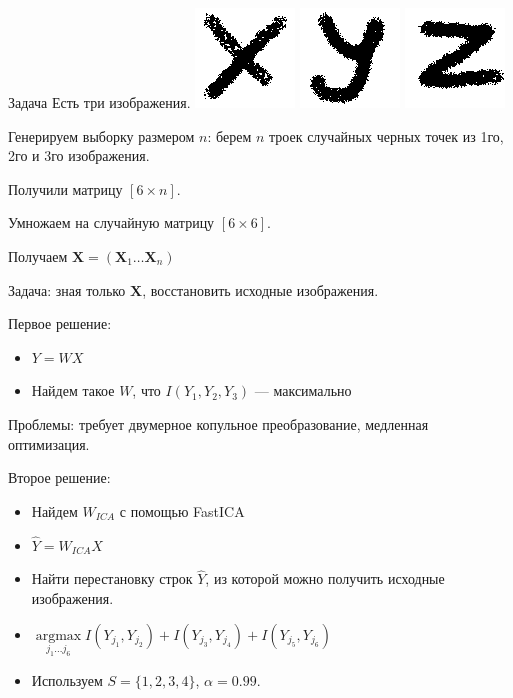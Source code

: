 \documentclass[14pt]{beamer}
\begin{document}
\begin{frame}{Задача}
    Есть три изображения.
    \includegraphics[scale=0.5]{x.png}
    \includegraphics[scale=0.5]{y.png}
    \includegraphics[scale=0.5]{z.png}

    Генерируем выборку размером $n$:
    берем $n$ троек случайных черных точек из 1го, 2го и 3го изображения.

    Получили матрицу $[6 \times n]$.

    Умножаем на случайную матрицу $[6\times6]$.

    Получаем $\mathbf X = (\mathbf X_1 \dots \mathbf X_n)$

    Задача: зная только $\mathbf X$, восстановить исходные изображения.

\end{frame}

\begin{frame}
Первое решение:
\begin{itemize}
    \item $Y = W X $
    \item Найдем такое $W$, что $ I (Y_1, Y_2,Y_3) $ — максимально
\end{itemize}
\pause
Проблемы:
требует двумерное копульное преобразование,
медленная оптимизация.
\end{frame}

\begin{frame}
    Второе решение:
    \begin{itemize}
        \item Найдем $W_{ICA}$ с помощью FastICA
        \item $\widehat Y = W_{ICA} X $
        \item Найти перестановку строк $\widehat Y$, из которой можно получить исходные изображения.
        \item $\mathop{argmax}\limits_{j_1 \dots j_6} I(Y_{j_1}, Y_{j_2}) + I(Y_{j_3}, Y_{j_4})  + I(Y_{j_5}, Y_{j_6}) $
        \item Используем $ S = \{ 1, 2, 3, 4 \} $, $\alpha = 0.99$.
    \end{itemize}
\end{frame}
\end{document}
